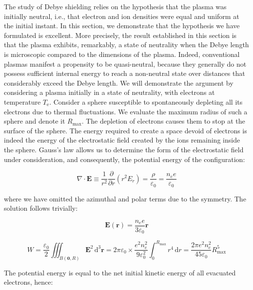 The study of Debye shielding relies on the hypothesis that the plasma was initially neutral, i.e., that electron and ion densities were equal and uniform at the initial instant. In this section, we demonstrate that the hypothesis we have formulated is excellent. More precisely, the result established in this section is that the plasma exhibits, remarkably, a state of neutrality when the Debye length is microscopic compared to the dimensions of the plasma. Indeed, conventional plasmas manifest a propensity to be quasi-neutral, because they generally do not possess sufficient internal energy to reach a non-neutral state over distances that considerably exceed the Debye length.  We will demonstrate the argument by considering a plasma initially in a state of neutrality, with electrons at temperature $T_\text{e}$. Consider a sphere susceptible to spontaneously depleting all its electrons due to thermal fluctuations. We evaluate the maximum radius of such a sphere and denote it $R_\text{max}$. The depletion of electrons causes them to stop at the surface of the sphere. The energy required to create a space devoid of electrons is indeed the energy of the electrostatic field created by the ions remaining inside the sphere. Gauss's law allows us to determine the form of the electrostatic field under consideration, and consequently, the potential energy of the configuration:

\begin{equation}
    \nabla\cdot\mathbf{E}\equiv\frac{1}{r^2}\frac{\partial}{\partial r}\left(r^2E_r\right)=\frac{\rho}{\varepsilon_0}=\frac{n_ee}{\varepsilon_0}
\end{equation}

where we have omitted the azimuthal and polar terms due to the symmetry. The solution follows trivially:

\begin{equation}
    \mathbf{E}(\mathbf{r})=\frac{n_ee}{3\varepsilon_0}\mathbf{r}
\end{equation}

\begin{equation}
    W=\frac{\varepsilon_0}{2}\iiint_{B(\mathbf{0},R)}\mathbf{E}^2\,\mathrm{d}^3\mathbf{r}=2\pi\varepsilon_0\times\frac{e^2n_e^2}{9\varepsilon_0^2}\int_0^{R_\text{max}}r^4\,\mathrm{d}r=\frac{2\pi e^2n_e^2}{45\varepsilon_0} R_\text{max}^5
\end{equation}

The potential energy is equal to the net initial kinetic energy of all evacuated electrons, hence:

